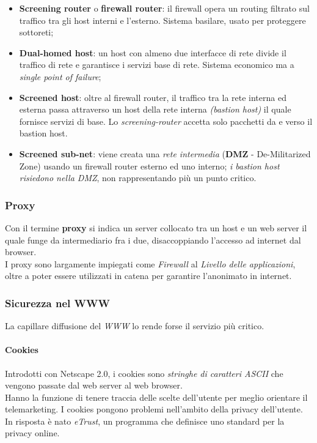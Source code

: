 \documentclass[a4paper,11pt]{article}
\def\para#1{\paragraph{#1}\label{#1}}
\begin{document}
\begin{itemize}
\item \textbf{Screening router} o \textbf{firewall router}: il firewall opera un routing filtrato sul traffico tra gli host interni e l'esterno. Sistema basilare, usato per proteggere sottoreti;
\item \textbf{Dual-homed host}: un host con almeno due interfacce di rete divide il traffico di rete e garantisce i servizi base di rete. Sistema economico ma a \textit{single point of failure};
\item \textbf{Screened host}: oltre al firewall router, il traffico tra la rete interna ed esterna passa attraverso un host della rete interna \textit{(bastion host)} il quale fornisce servizi di base. Lo \textit{screening-router} accetta solo pacchetti da e verso il bastion host. 
\item \textbf{Screened sub-net}: viene creata una \textit{rete intermedia} (\textbf{DMZ} - De-Militarized Zone) usando un firewall router esterno ed uno interno; \textit{i bastion host risiedono nella DMZ}, non rappresentando più un punto critico. 
\end{itemize}
\subsubsection{Proxy}
Con il termine \textbf{proxy} si indica un server collocato tra un host e un web server il quale funge da intermediario fra i due, disaccoppiando l'accesso ad internet dal browser.\\ I proxy sono largamente impiegati come \textit{Firewall} al \textit{Livello delle applicazioni}, oltre a poter essere utilizzati in catena per garantire l'anonimato in internet.
\subsubsection{Sicurezza nel WWW}
La capillare diffusione del \textit{WWW} lo rende forse il servizio più critico. 
\para{Cookies} Introdotti con Netscape 2.0, i cookies sono \textit{stringhe di caratteri ASCII} che vengono passate dal web server al web browser.\\ Hanno la funzione di tenere traccia delle scelte dell'utente per meglio orientare il telemarketing. I cookies pongono problemi nell'ambito della privacy dell'utente. In risposta è nato \textit{eTrust}, un programma che definisce uno standard per la privacy online.
\end{document}
